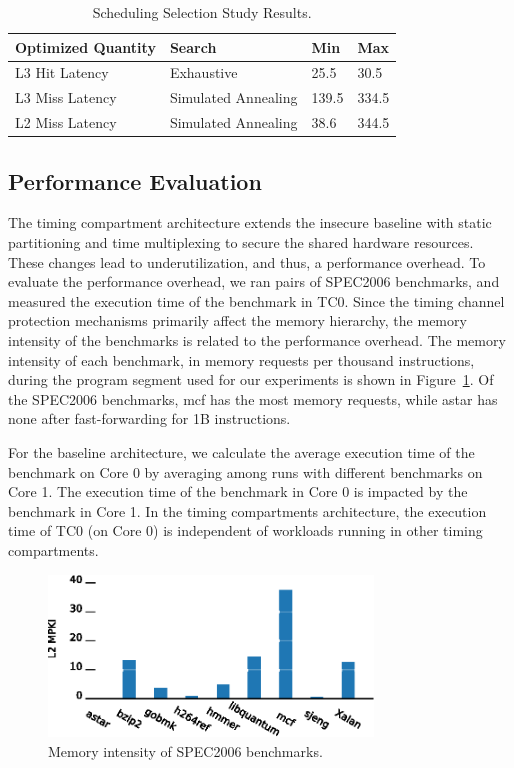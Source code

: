 \begin{table}
    \caption{Scheduling Selection Study Results.}
    \centering
    \begin{tabular}{|l|l|l|l|}
        \hline
        \multicolumn{1}{|l|}{Optimized Quantity} & Search & Min & Max \\\hline
        \multicolumn{1}{|l|}{L3 Hit Latency} & Exhaustive & 25.5 & 30.5 \\\hline
        \multicolumn{1}{|l|}{L3 Miss Latency} & Simulated Annealing& 139.5 & 334.5 \\\hline
        \multicolumn{1}{|l|}{L2 Miss Latency} & Simulated Annealing& 38.6 & 344.5 \\\hline
    \end{tabular}
    \label{tab:coord_results}
\end{table}

\subsection{Performance Evaluation}

The timing compartment architecture extends the insecure baseline with
static partitioning and time multiplexing to secure the shared hardware 
resources. These changes lead to underutilization, and thus, a performance
overhead. To evaluate the performance overhead, we ran pairs of
SPEC2006 benchmarks, and measured the execution time of the benchmark
in TC0. Since the timing channel protection mechanisms primarily affect the memory 
hierarchy, the memory intensity of the benchmarks is related to the performance 
overhead.
The memory intensity of each benchmark, in memory requests per thousand 
instructions, during the program segment used for our experiments is shown in
Figure~\ref{fig:memstudy}. Of the SPEC2006 benchmarks, mcf has the most memory 
requests, while astar has none after fast-forwarding for 1B instructions.

For the baseline architecture, we calculate the average execution time of the 
benchmark on Core 0 by averaging among runs with different benchmarks on Core 1. 
The execution time of the benchmark in Core 0 is impacted by the benchmark in 
Core 1. In the timing compartments architecture, the execution time of TC0 (on 
Core 0) is independent of workloads running in other timing compartments.

\begin{figure}
    \begin{center}
        \includegraphics[width=3.4in]{figs/MPKI.eps}
        \caption{Memory intensity of SPEC2006 benchmarks.}
        \label{fig:memstudy}
    \end{center}
\end{figure}

